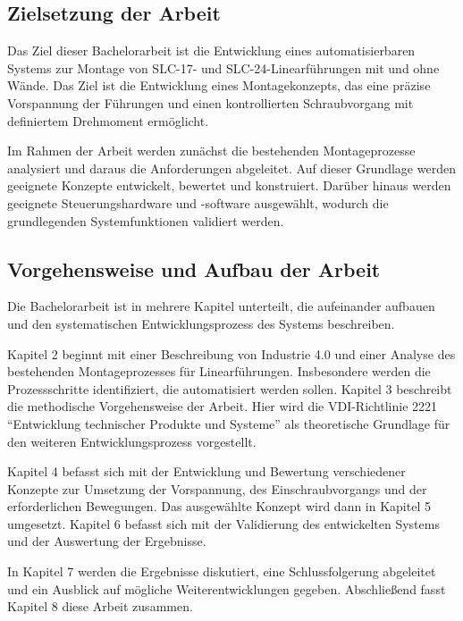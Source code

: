 \subsection{Zielsetzung der Arbeit}

Das Ziel dieser Bachelorarbeit ist die Entwicklung eines automatisierbaren Systems zur Montage von SLC-17- und SLC-24-Linearführungen mit und ohne Wände. Das Ziel ist die Entwicklung eines Montagekonzepts, das eine präzise Vorspannung der Führungen und einen kontrollierten Schraubvorgang mit definiertem Drehmoment ermöglicht.

Im Rahmen der Arbeit werden zunächst die bestehenden Montageprozesse analysiert und daraus die Anforderungen abgeleitet. Auf dieser Grundlage werden geeignete Konzepte entwickelt, bewertet und konstruiert. Darüber hinaus werden geeignete Steuerungshardware und -software ausgewählt, wodurch die grundlegenden Systemfunktionen validiert werden.

\subsection{Vorgehensweise und Aufbau der Arbeit}
Die Bachelorarbeit ist in mehrere Kapitel unterteilt, die aufeinander aufbauen und den systematischen Entwicklungsprozess des Systems beschreiben.

Kapitel 2 beginnt mit einer Beschreibung von Industrie 4.0 und einer Analyse des bestehenden Montageprozesses für Linearführungen. Insbesondere werden die Prozessschritte identifiziert, die automatisiert werden sollen. Kapitel 3 beschreibt die methodische Vorgehensweise der Arbeit. Hier wird die VDI-Richtlinie 2221 \enquote{Entwicklung technischer Produkte und Systeme} als theoretische Grundlage für den weiteren Entwicklungsprozess vorgestellt.

Kapitel 4 befasst sich mit der Entwicklung und Bewertung verschiedener Konzepte zur Umsetzung der Vorspannung, des Einschraubvorgangs und der erforderlichen Bewegungen. Das ausgewählte Konzept wird dann in Kapitel 5 umgesetzt. Kapitel 6 befasst sich mit der Validierung des entwickelten Systems und der Auswertung der Ergebnisse.

In Kapitel 7 werden die Ergebnisse diskutiert, eine Schlussfolgerung abgeleitet und ein Ausblick auf mögliche Weiterentwicklungen gegeben. Abschließend fasst Kapitel 8 diese Arbeit zusammen.